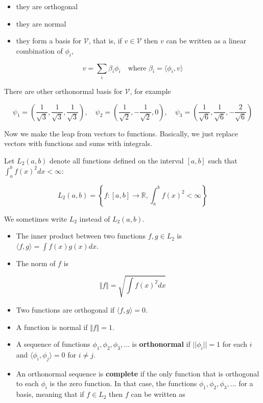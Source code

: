 \begin{itemize}[tightlist]
\item
  they are orthogonal
\item
  they are normal
\item
  they form a basis for \(\mathcal{V}\), that is, if
  \(v \in \mathcal{V}\) then \(v\) can be written as a linear
  combination of \(\phi_{i}\),
\end{itemize}

\[v = \sum_{i} \beta_{i} \phi_{i}
\quad \text{where } \beta_{i} = \langle \phi_{i}, v \rangle\]

There are other orthonormal basis for \(\mathcal{V}\), for example

\[ \psi_{1} = \left( \frac{1}{\sqrt{3}}, \frac{1}{\sqrt{3}} , \frac{1}{\sqrt{3}} \right),
\quad
\psi_{2} = \left( \frac{1}{\sqrt{2}}, -\frac{1}{\sqrt{2}} , 0 \right),
\quad
\psi_{3} = \left( \frac{1}{\sqrt{6}}, \frac{1}{\sqrt{6}} , -\frac{2}{\sqrt{6}} \right)
\]

Now we make the leap from vectors to functions. Basically, we just
replace vectors with functions and sums with integrals.

Let \(L_{2}(a, b)\) denote all functions defined on the interval
\([a, b]\) such that \(\int_a^{b} f(x)^{2} dx < \infty\):

\[ L_{2}(a, b) = \left\{ f: [a, b] \rightarrow \mathbb{R} , \int_a^{b} f(x)^{2} < \infty \right\} \]

We sometimes write \(L_{2}\) instead of \(L_{2}(a, b)\).

\begin{itemize}[tightlist]
\item
  The inner product between two functions \(f, g \in L_{2}\) is
  \(\langle f, g \rangle = \int f(x) g(x) dx\).
\item
  The norm of \(f\) is
\end{itemize}

\[ \Vert f \Vert = \sqrt{\int f(x)^{2} dx} \]

\begin{itemize}[tightlist]
\item
  Two functions are orthogonal if \(\langle f, g \rangle = 0\).
\item
  A function is normal if \(\Vert f \Vert = 1\).
\item
  A sequence of functions \(\phi_{1}, \phi_{2}, \phi_{3}, \dots\) is
  \textbf{orthonormal} if \(|| \phi_{i} || = 1\) for each \(i\) and
  \(\langle \phi_{i}, \phi_{j} \rangle = 0\) for \(i \neq j\).
\item
  An orthonormal sequence is \textbf{complete} if the only function that
  is orthogonal to each \(\phi_{i}\) is the zero function. In that case,
  the functions \(\phi_{1}, \phi_{2}, \phi_{3}, \dots\) for a basis, meaning
  that if \(f \in L_{2}\) then \(f\) can be written as
\end{itemize}

